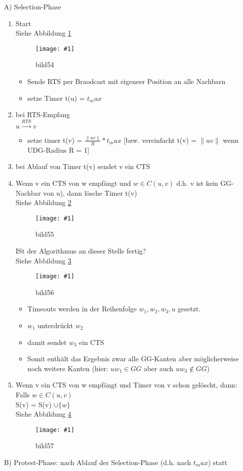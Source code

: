 \documentclass{article}
\newcommand{\bild}[4]{ %
	\begin{figure}[h!]
		\centering
		\texttt{[image: \#1]}
		\caption{#3}
		\label{#4}
	\end{figure}	
}
\newcommand{\sieheBild}[4]{
	Siehe Abbildung \ref{#4}
	\bild{#1}{#2}{#3}{#4}
}
\newcommand{\doubleAbs}[1]{
	\|#1\|
}
\begin{document}
A) Selection-Phase
\begin{enumerate}
	\item Start \\
	\sieheBild{Bilder/54.png}{0.4}{bild54}{Bild 54}
	\begin{itemize}
		\item Sende RTS per Braodcast mit eigeneer Position an alle Nachbarn
		\item setze Timer t(u) = $t_max$
	\end{itemize}
	\item bei RTS-Empfang\\
	$u \overset{RTS}{\rightarrow} v$\\
	\begin{itemize}
		\item setze timer t(v) = $\frac{\doubleAbs{uv}}{R} * t_max$ [bzw.  vereinfacht t(v) = $\doubleAbs{uv}$ wenn UDG-Radius R = 1]
	\end{itemize}
		
	\item bei Ablauf von Timer t(v) sendet v ein CTS
	\item Wenn v ein CTS von w empfängt und $w \in C(u,v)$ d.h. v ist kein GG-Nachbar von u), dann lösche Timer t(v) \\
	\sieheBild{Bilder/55.png}{0.4}{bild55}{Bild 55}
	
	ISt der Algorithmus an dieser Stelle fertig?
	\\
	\sieheBild{Bilder/56.png}{0.4}{bild56}{Bild 56}
	\begin{itemize}
		\item Timeouts werden in der Reihenfolge $w_1,w_2,w_3,u$ gesetzt.
		\item $w_1$ unterdrückt $w_2$
		\item damit sendet $w_3$ ein CTS
		\item Somit enthält das Ergebnis zwar alle GG-Kanten aber möglicherweise noch weitere Kanten (hier: $uw_1 \in GG$ aber auch $uw_3 \not\in GG$)
	\end{itemize}
	\item Wenn v ein CTS von w empfängt und Timer von v schon gelöscht, dann: \\
	Falls $w \in C(u,v)$ \\
	S(v) = S(v) $\cup \{w\}$\\
	\sieheBild{Bilder/57.png}{0.4}{bild57}{Bild 57}
\end{enumerate}
B) Protest-Phase: nach Ablauf der Selection-Phase (d.h. nach $t_max$) statt
\end{document}
